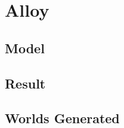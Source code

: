 \documentclass{article}
\begin{document}
	\section{Alloy}
	\subsection{Model}
	\texttt{}	
	\subsection{Result}
	\subsection{Worlds Generated}
	
\end{document}
